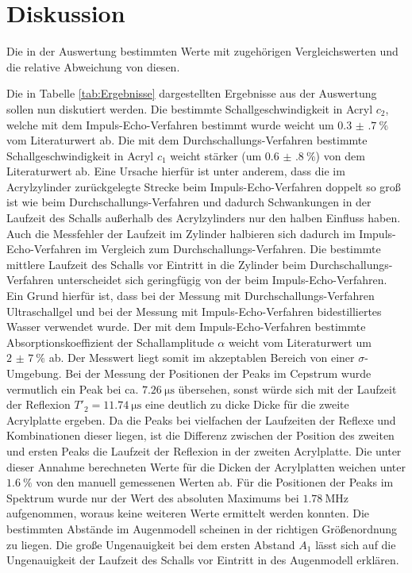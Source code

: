 
\section{Diskussion}
\label{sec:Diskussion}
\begin{table}
	\centering
	\caption{Die in der Auswertung bestimmten Werte mit zugehörigen Vergleichswerten und die relative Abweichung von diesen.}
	
\end{table}
Die in Tabelle \ref{tab:Ergebnisse} dargestellten Ergebnisse aus der Auswertung sollen nun diskutiert werden.
Die bestimmte Schallgeschwindigkeit in Acryl $c_2$, welche mit dem Impuls-Echo-Verfahren bestimmt wurde weicht um $\SI{0.3(7)}{\percent}$ vom Literaturwert \cite{cAcryl} ab. Die mit dem Durchschallungs-Verfahren bestimmte Schallgeschwindigkeit in Acryl $c_1$ weicht stärker (um $\SI{0.6(8)}{\percent}$) von dem Literaturwert \cite{cAcryl} ab. Eine Ursache hierfür ist unter anderem, dass die im Acrylzylinder zurückgelegte Strecke beim Impuls-Echo-Verfahren doppelt so groß ist wie beim Durchschallungs-Verfahren und dadurch Schwankungen in der Laufzeit des Schalls außerhalb des Acrylzylinders nur den halben Einfluss haben. Auch die Messfehler der Laufzeit im Zylinder halbieren sich dadurch im Impuls-Echo-Verfahren im Vergleich zum Durchschallungs-Verfahren. Die bestimmte mittlere Laufzeit des Schalls vor Eintritt in die Zylinder beim Durchschallungs-Verfahren unterscheidet sich geringfügig von der beim Impuls-Echo-Verfahren. Ein Grund hierfür ist, dass bei der Messung mit Durchschallungs-Verfahren Ultraschallgel und bei der Messung mit Impuls-Echo-Verfahren bidestilliertes Wasser verwendet wurde. Der mit dem Impuls-Echo-Verfahren bestimmte Absorptionskoeffizient der Schallamplitude $\alpha$ weicht vom Literaturwert \cite{alphaAcryl} um $\SI{2(7)}{\percent}$ ab. Der Messwert liegt somit im akzeptablen Bereich von einer $\sigma$-Umgebung. Bei der Messung der Positionen der Peaks im Cepstrum wurde vermutlich ein Peak bei ca. $\SI{7.26}{\micro\second}$ übersehen, sonst würde sich mit der Laufzeit der Reflexion $T'_2=\SI{11.74}{\micro\second}$ eine deutlich zu dicke Dicke für die zweite Acrylplatte ergeben. Da die Peaks bei vielfachen der Laufzeiten der Reflexe und Kombinationen dieser liegen, ist die Differenz zwischen der Position des zweiten und ersten Peaks die Laufzeit der Reflexion in der zweiten Acrylplatte. Die unter dieser Annahme berechneten Werte für die Dicken der Acrylplatten weichen unter $\SI{1.6}{\percent}$ von den manuell gemessenen Werten ab. Für die Positionen der Peaks im Spektrum wurde nur der Wert des absoluten Maximums bei $\SI{1.78}{\mega\hertz}$ aufgenommen, woraus keine weiteren Werte ermittelt werden konnten. Die bestimmten Abstände im Augenmodell scheinen in der richtigen Größenordnung zu liegen. Die große Ungenauigkeit bei dem ersten Abstand $A_1$ lässt sich auf die Ungenauigkeit der Laufzeit des Schalls vor Eintritt in des Augenmodell erklären.
